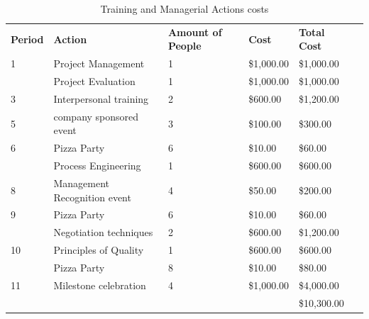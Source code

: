 \begin{table}[]
\centering
\caption{Training and Managerial Actions costs}
\label{tab:actions}
\begin{tabular}{llllll}
\textbf{Period} & \textbf{Action}              & \textbf{Amount of People} & \textbf{Cost} & \textbf{Total Cost}                 &  \\
1               & Project Management           & 1                         & \$1,000.00    & \$1,000.00                          &  \\
                & Project Evaluation           & 1                         & \$1,000.00    & \$1,000.00                          &  \\
3               & Interpersonal training       & 2                         & \$600.00      & \$1,200.00                          &  \\
5               & company sponsored event      & 3                         & \$100.00      & \$300.00                            &  \\
6               & Pizza Party                  & 6                         & \$10.00       & \$60.00                             &  \\
                & Process Engineering          & 1                         & \$600.00      & \$600.00                            &  \\
8               & Management Recognition event & 4                         & \$50.00       & \$200.00                            &  \\
9               & Pizza Party                  & 6                         & \$10.00       & \$60.00                             &  \\
                & Negotiation techniques       & 2                         & \$600.00      & \$1,200.00                          &  \\
10              & Principles of Quality        & 1                         & \$600.00      & \$600.00                            &  \\
                & Pizza Party                  & 8                         & \$10.00       & \$80.00                             &  \\
11              & Milestone celebration        & 4                         & \$1,000.00    & \$4,000.00                          &  \\
                &                              &                           &               & \cellcolor[HTML]{FFFE65}\$10,300.00 & 
\end{tabular}
\end{table}

